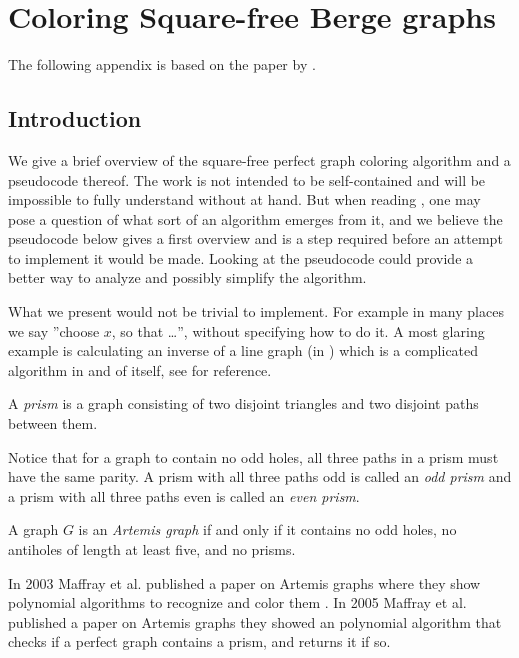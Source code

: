 \chapter{Coloring Square-free Berge graphs}
\label{ch:coloringSquareFree}

The following appendix is based on the paper  by \citeauthor{coloringSquareFree} \cite{coloringSquareFree}.

\section{Introduction}
We give a brief overview of the square-free perfect graph coloring algorithm and a pseudocode thereof. The work is not intended to be self-contained and will be impossible to fully understand without \cite{coloringSquareFree} at hand. But when reading \cite{coloringSquareFree}, one may pose a question of what sort of an algorithm emerges from it, and we believe the pseudocode below gives a first overview and is a step required before an attempt to implement it would be made. Looking at the pseudocode could provide a better way to analyze and possibly simplify the algorithm.

What we present would not be trivial to implement. For example in many places we say ''choose $x$, so that \dots'', without specifying how to do it. A most glaring example is calculating an inverse of a line graph (in ) which is a complicated algorithm in and of itself, see \cite{Liu2014} for reference.

\begin{defnTwo}[prism]
  A \emph{prism} is a graph consisting of two disjoint triangles and two disjoint paths between them.
\end{defnTwo}

Notice that for a graph to contain no odd holes, all three paths in a prism must have the same parity. A prism with all three paths odd is called an \emph{odd prism} and a prism with all three paths even is called an \emph{even prism}.

\begin{defnTwo}
  A graph $G$ is an \emph{Artemis graph} if and only if it contains no odd holes, no antiholes of length at least five, and no prisms.
\end{defnTwo}

In 2003 Maffray et al. published a paper on Artemis graphs where they show polynomial algorithms to recognize and color them \cite{Maffray2006}. In 2005 Maffray et al. published a paper on Artemis graphs \cite{Maffray2005} they showed an polynomial algorithm that checks if a perfect graph contains a prism, and returns it if so.

